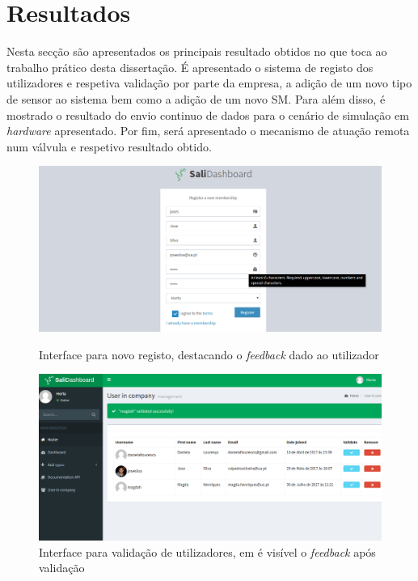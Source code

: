 \section{Resultados}


Nesta secção são apresentados os principais resultado obtidos no que toca ao trabalho prático desta dissertação. É apresentado o sistema de registo dos utilizadores e respetiva validação por parte da empresa, a adição de um novo tipo de sensor ao sistema bem como a adição de um novo \acl{SM}. Para além disso, é mostrado o resultado do envio continuo de dados para o cenário de simulação em \textit{hardware} apresentado. Por fim, será apresentado o mecanismo de atuação remota num válvula e respetivo resultado obtido. 







\newpage


\begin{figure}[h]
	\centering
	\begin{minipage}[b]{0.495\textwidth}
		\centering
		\includegraphics[width=\textwidth]{prints-web/register.png}
		\caption{Interface para novo registo, destacando o \textit{feedback} dado ao utilizador}
		\label{novouser}
	\end{minipage}
	\hfill
	\begin{minipage}[b]{0.495\textwidth}
		\centering
		\includegraphics[width=\textwidth]{prints-web/validate_company.png}
		\caption{Interface para validação de utilizadores, em é visível o \textit{feedback} após validação}
		\label{validateuser}
	\end{minipage}
\end{figure}


